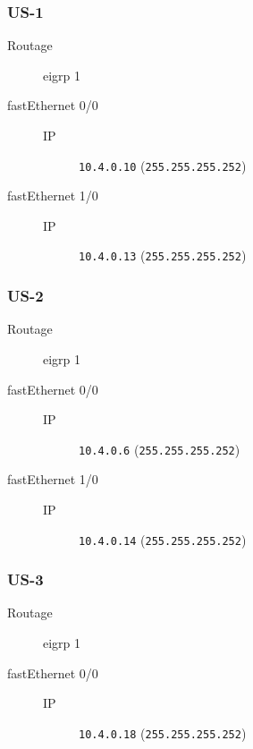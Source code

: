 \subsubsection{US-1}

	\begin{description}
		\item[Routage] eigrp 1
		\item[fastEthernet 0/0] 
		\begin{description}
			\item[IP] \texttt{10.4.0.10} (\texttt{255.255.255.252})
		\end{description}

		\item[fastEthernet 1/0] 
		\begin{description}
			\item[IP] \texttt{10.4.0.13} (\texttt{255.255.255.252})
		\end{description}

	\end{description}
\subsubsection{US-2}

	\begin{description}
		\item[Routage] eigrp 1
		\item[fastEthernet 0/0] 
		\begin{description}
			\item[IP] \texttt{10.4.0.6} (\texttt{255.255.255.252})
		\end{description}

		\item[fastEthernet 1/0] 
		\begin{description}
			\item[IP] \texttt{10.4.0.14} (\texttt{255.255.255.252})
		\end{description}

	\end{description}
\subsubsection{US-3}

	\begin{description}
		\item[Routage] eigrp 1
		\item[fastEthernet 0/0] 
		\begin{description}
			\item[IP] \texttt{10.4.0.18} (\texttt{255.255.255.252})
		\end{description}

	\end{description}
